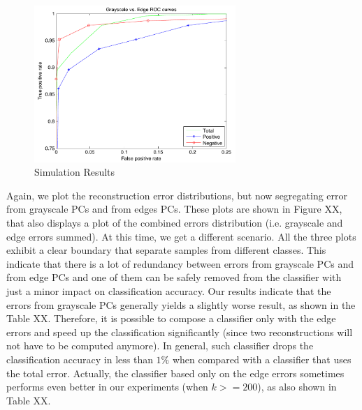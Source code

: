 \documentclass[10pt, conference, compsocconf]{IEEEtran}
\begin{document}
\begin{figure}[t]
\centering
\includegraphics[width=3in]{roc_gray_vs_edge}
\caption{Simulation Results}
\label{roc_gray_vs_edge}
\end{figure}

Again, we plot the reconstruction error distributions, but now segregating error from grayscale PCs and from edges PCs. These plots are shown in Figure XX, that also displays a plot of the combined errors distribution (i.e. grayscale and edge errors summed). At this time, we get a different scenario. All the three plots exhibit a clear boundary that separate samples from different classes. This indicate that there is a lot of redundancy between errors from grayscale PCs and from edge PCs and one of them can be safely removed from the classifier with just a minor impact on classification accuracy. Our results indicate that the errors from grayscale PCs generally yields a slightly worse result, as shown in the Table XX. Therefore, it is possible to compose a classifier only with the edge errors and speed up the classification significantly (since two reconstructions will not have to be computed anymore). In general, such classifier drops the classification accuracy in less than $1\%$ when compared with a classifier that uses the total error. Actually, the classifier based only on the edge errors sometimes performs even better in our experiments (when $k >= 200$), as also shown in Table XX.
\end{document}
